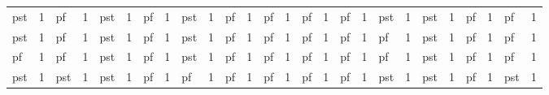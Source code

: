\begin{table}[H]
\begin{center}
\begin{tabular}{llllllllllllllllllllllllll}
\rowcolor[HTML]{9AFF99} 
\cellcolor[HTML]{FFCCC9}pst & 1                         & pf                          & 1                         & \cellcolor[HTML]{FFCCC9}pst & 1                         & pf                          & 1                         & \cellcolor[HTML]{FFCCC9}pst & 1                         & pf                          & 1                         & pf                          & 1                         & pf                         & 1                         & pf                          & 1                         & \cellcolor[HTML]{FFCCC9}pst & 1                         & \cellcolor[HTML]{FFCCC9}pst & 1                         & pf                          & 1                         & pf                          & 1                         \\
\rowcolor[HTML]{9AFF99} 
\cellcolor[HTML]{FFCCC9}pst & 1                         & pf                          & 1                         & \cellcolor[HTML]{FFCCC9}pst & 1                         & pf                          & 1                         & \cellcolor[HTML]{FFCCC9}pst & 1                         & pf                          & 1                         & pf                          & 1                         & pf                         & 1                         & pf                          & 1                         & pf                          & 1                         & \cellcolor[HTML]{FFCCC9}pst & 1                         & pf                          & 1                         & pf                          & 1                         \\
\rowcolor[HTML]{9AFF99} 
pf                          & 1                         & pf                          & 1                         & \cellcolor[HTML]{FFCCC9}pst & 1                         & pf                          & 1                         & \cellcolor[HTML]{FFCCC9}pst & 1                         & pf                          & 1                         & pf                          & 1                         & pf                         & 1                         & pf                          & 1                         & pf                          & 1                         & \cellcolor[HTML]{FFCCC9}pst & 1                         & pf                          & 1                         & pf                          & 1                         \\
\rowcolor[HTML]{9AFF99} 
\cellcolor[HTML]{FFCCC9}pst & 1                         & \cellcolor[HTML]{FFCCC9}pst & 1                         & \cellcolor[HTML]{FFCCC9}pst & 1                         & pf                          & 1                         & pf                          & 1                         & pf                          & 1                         & pf                          & 1                         & pf                         & 1                         & pf                          & 1                         & \cellcolor[HTML]{FFCCC9}pst & 1                         & \cellcolor[HTML]{FFCCC9}pst & 1                         & pf                          & 1                         & \cellcolor[HTML]{FFCCC9}pst & 1                         \\

\end{tabular}
\end{center}
\end{table}
